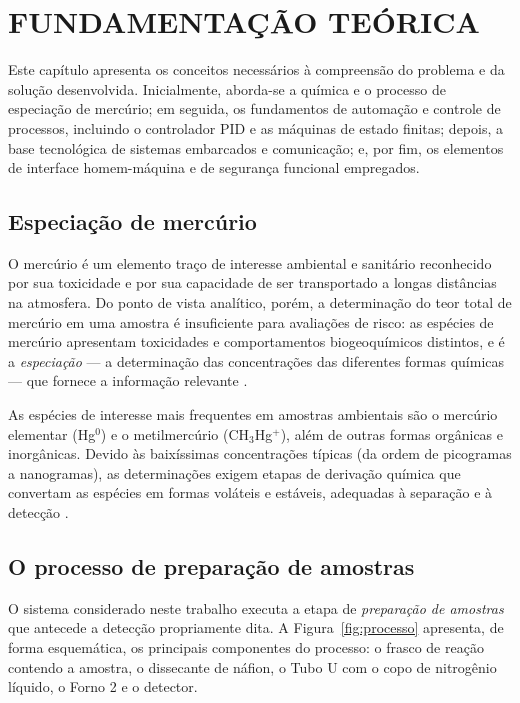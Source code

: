 \chapter{FUNDAMENTAÇÃO TEÓRICA}

Este capítulo apresenta os conceitos necessários à compreensão do problema e da
solução desenvolvida. Inicialmente, aborda-se a química e o processo de
especiação de mercúrio; em seguida, os fundamentos de automação e controle de
processos, incluindo o controlador PID e as máquinas de estado finitas; depois,
a base tecnológica de sistemas embarcados e comunicação; e, por fim, os
elementos de interface homem-máquina e de segurança funcional empregados.

\section{Especiação de mercúrio}

O mercúrio é um elemento traço de interesse ambiental e sanitário reconhecido
por sua toxicidade e por sua capacidade de ser transportado a longas distâncias
na atmosfera. Do ponto de vista analítico, porém, a determinação do teor total
de mercúrio em uma amostra é insuficiente para avaliações de risco: as espécies
de mercúrio apresentam toxicidades e comportamentos biogeoquímicos distintos, e
é a \emph{especiação} --- a determinação das concentrações das diferentes formas
químicas --- que fornece a informação relevante \cite{leermakers2005}.

As espécies de interesse mais frequentes em amostras ambientais são o mercúrio
elementar (Hg$^0$) e o metilmercúrio (CH$_3$Hg$^+$), além de outras formas
orgânicas e inorgânicas. Devido às baixíssimas concentrações típicas (da ordem
de picogramas a nanogramas), as determinações exigem etapas de derivação
química que convertam as espécies em formas voláteis e estáveis, adequadas à
separação e à detecção \cite{bloom1989, leermakers2005}.

\section{O processo de preparação de amostras}

O sistema considerado neste trabalho executa a etapa de \emph{preparação de
amostras} que antecede a detecção propriamente dita. A Figura~\ref{fig:processo}
apresenta, de forma esquemática, os principais componentes do processo: o frasco
de reação contendo a amostra, o dissecante de náfion, o Tubo U com o copo de
nitrogênio líquido, o Forno 2 e o detector.


